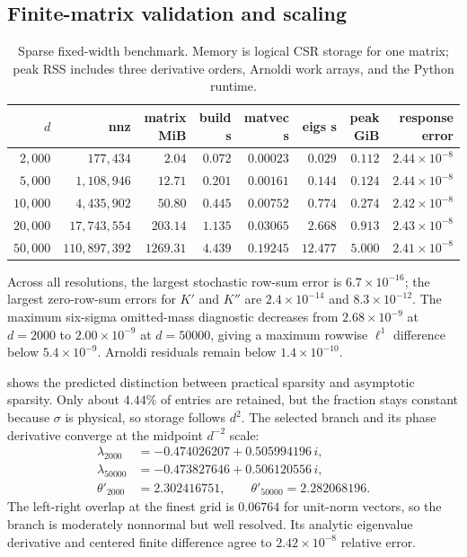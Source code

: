 \documentclass[11pt]{article}
\theoremstyle{definition}
\theoremstyle{remark}
\begin{document}
\subsection{Finite-matrix validation and scaling}

\begin{table}[t]
\centering
\caption{Sparse fixed-width benchmark.  Memory is logical CSR storage for
one matrix; peak RSS includes three derivative orders, Arnoldi work arrays,
and the Python runtime.}
\label{tab:benchmark}
\small
\begin{tabular}{rrrrrrrr}
\toprule
$d$ & nnz & matrix MiB & build s & matvec s & eigs s & peak GiB &
response error\\
\midrule
$2{,}000$  & $177{,}434$   & $2.04$    & $0.072$ & $0.00023$ & $0.029$ & $0.112$ & $2.44{\times}10^{-8}$\\
$5{,}000$  & $1{,}108{,}946$ & $12.71$ & $0.201$ & $0.00161$ & $0.144$ & $0.124$ & $2.44{\times}10^{-8}$\\
$10{,}000$ & $4{,}435{,}902$ & $50.80$ & $0.445$ & $0.00752$ & $0.774$ & $0.274$ & $2.42{\times}10^{-8}$\\
$20{,}000$ & $17{,}743{,}554$ & $203.14$ & $1.135$ & $0.03065$ & $2.668$ & $0.913$ & $2.43{\times}10^{-8}$\\
$50{,}000$ & $110{,}897{,}392$ & $1269.31$ & $4.439$ & $0.19245$ & $12.477$ & $5.000$ & $2.41{\times}10^{-8}$\\
\bottomrule
\end{tabular}
\end{table}

Across all resolutions, the largest stochastic row-sum error is
$6.7\times10^{-16}$; the largest zero-row-sum errors for $K'$ and $K''$ are
$2.4\times10^{-14}$ and $8.3\times10^{-12}$.  The maximum six-sigma
omitted-mass diagnostic decreases from $2.68\times10^{-9}$ at $d=2000$ to
$2.00\times10^{-9}$ at $d=50000$, giving a maximum rowwise $\ell^1$
difference below $5.4\times10^{-9}$.  Arnoldi residuals remain below
$1.4\times10^{-10}$.

 shows the predicted distinction between
practical sparsity and asymptotic sparsity.  Only about $4.44\%$ of entries
are retained, but the fraction stays constant because $\sigma$ is physical,
so storage follows $d^2$.  The selected branch and its phase derivative
converge at the midpoint $d^{-2}$ scale:
\begin{align*}
  \lambda_{2000}&=-0.474026207+0.505994196\,i,\\
  \lambda_{50000}&=-0.473827646+0.506120556\,i,\\
  \theta'_{2000}&=2.302416751,\qquad
  \theta'_{50000}=2.282068196.
\end{align*}
The left-right overlap at the finest grid is $0.06764$ for unit-norm
vectors, so the branch is moderately nonnormal but well resolved.  Its
analytic eigenvalue derivative and centered finite difference agree to
$2.42\times10^{-8}$ relative error.
\end{document}
